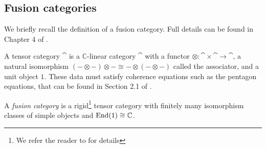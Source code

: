 
\subsection{Fusion categories}

We briefly recall the definition of a fusion category. Full details can be found in Chapter 4 of \cite{Etingof2015}.
\begin{definition}
	A tensor category $\cat$ is a $\mathbb{C}$-linear category $\cat$ with a functor $\otimes:\cat\times\cat\to\cat$, a natural isomorphism $(-\otimes-)\otimes-\cong-\otimes(-\otimes-)$ called the associator, and a unit object $1$.
	These data must satisfy coherence equations such as the pentagon equations, that can be found in Section 2.1 of \cite{Etingof2015}.
	
	A \emph{fusion category} is a rigid\footnote{We refer the reader to \cite{Etingof2015} for details} tensor category with finitely many isomorphism classes of simple objects and $\operatorname{End}(1)\cong \mathbb{C}$.
	

\end{definition}
